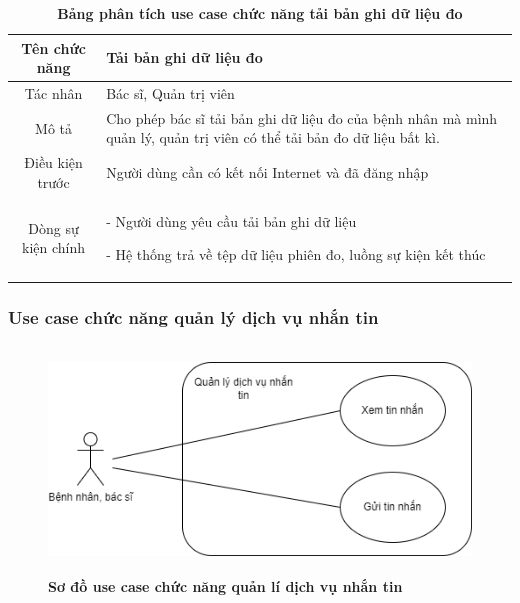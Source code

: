   \begin{table}[H]
    \caption{\bfseries \fontsize{12pt}{0pt}\selectfont Bảng phân tích use case chức năng tải bản ghi dữ liệu đo}
    \centering
    \begin{tabularx}{0.9\textwidth}{|c|X|}
      \hline
      \textbf{Tên chức năng} & \textbf{Tải bản ghi dữ liệu đo} \\
      \hline
      Tác nhân & Bác sĩ, Quản trị viên \\
      \hline
      Mô tả & Cho phép bác sĩ tải bản ghi dữ liệu đo của bệnh nhân
      mà mình quản lý, quản trị viên có thể tải bản đo dữ liệu bất kì.\\
      \hline
      Điều kiện trước & Người dùng cần có kết nối Internet và đã đăng nhập \\
      \hline
      Dòng sự kiện chính & 
        - Người dùng yêu cầu tải bản ghi dữ liệu

        - Hệ thống trả về tệp dữ liệu phiên đo, luồng sự kiện kết thúc        
        \\
      \hline
    \end{tabularx}
  \end{table}

\subsubsection{Use case chức năng quản lý dịch vụ nhắn tin}
  \begin{figure}[H]
    \centering
    \includegraphics[width=12cm,height=6cm]{Images/use_case/use_case_send_receive_message.png}
    \caption[Sơ đồ use case chức năng quản lí dịch vụ nhắn tin]{\bfseries \fontsize{12pt}{0pt}
    \selectfont Sơ đồ use case chức năng quản lí dịch vụ nhắn tin}
    \label{use_case_chat} %
  \end{figure}

